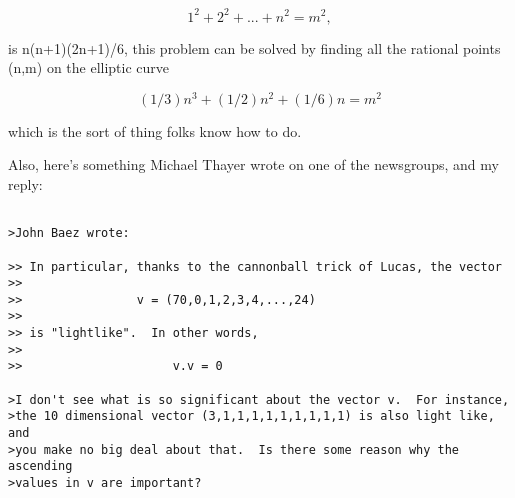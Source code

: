 $$

1^{2} + 2^{2} + ... + n^{2} = m^{2},
$$
    

is n(n+1)(2n+1)/6, this problem can be solved by finding all the
rational points (n,m) on the elliptic curve


$$

(1/3) n^{3} + (1/2) n^{2} + (1/6) n = m^{2}
$$
    

which is the sort of thing folks know how to do.
                                                    
Also, here's something 
Michael Thayer wrote on one of the newsgroups, and my reply:

\begin{verbatim}

>John Baez wrote:

>> In particular, thanks to the cannonball trick of Lucas, the vector
>>
>>                v = (70,0,1,2,3,4,...,24)
>>
>> is "lightlike".  In other words,
>>
>>                     v.v = 0

>I don't see what is so significant about the vector v.  For instance,
>the 10 dimensional vector (3,1,1,1,1,1,1,1,1,1) is also light like, and
>you make no big deal about that.  Is there some reason why the ascending
>values in v are important?
\end{verbatim}
    

